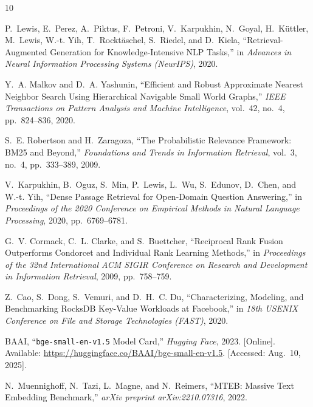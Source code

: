 \documentclass[conference]{IEEEtran}
\begin{document}
\begin{thebibliography}{10}

P.~Lewis, E.~Perez, A.~Piktus, F.~Petroni, V.~Karpukhin, N.~Goyal, H.~K\"uttler, M.~Lewis, W.-t. Yih, T.~Rockt\"aschel, S.~Riedel, and D.~Kiela,
``Retrieval-Augmented Generation for Knowledge-Intensive NLP Tasks,''
in \emph{Advances in Neural Information Processing Systems (NeurIPS)}, 2020.

Y.~A. Malkov and D.~A. Yashunin,
``Efficient and Robust Approximate Nearest Neighbor Search Using Hierarchical Navigable Small World Graphs,''
\emph{IEEE Transactions on Pattern Analysis and Machine Intelligence},
vol.~42, no.~4, pp.~824--836, 2020.

S.~E. Robertson and H.~Zaragoza,
``The Probabilistic Relevance Framework: BM25 and Beyond,''
\emph{Foundations and Trends in Information Retrieval},
vol.~3, no.~4, pp.~333--389, 2009.

V.~Karpukhin, B.~Oguz, S.~Min, P.~Lewis, L.~Wu, S.~Edunov, D.~Chen, and W.-t. Yih,
``Dense Passage Retrieval for Open-Domain Question Answering,''
in \emph{Proceedings of the 2020 Conference on Empirical Methods in Natural Language Processing}, 2020, pp.~6769--6781.

G.~V. Cormack, C.~L. Clarke, and S.~Buettcher,
``Reciprocal Rank Fusion Outperforms Condorcet and Individual Rank Learning Methods,''
in \emph{Proceedings of the 32nd International ACM SIGIR Conference on Research and Development in Information Retrieval}, 2009, pp.~758--759.

Z.~Cao, S.~Dong, S.~Vemuri, and D.~H.~C. Du,
``Characterizing, Modeling, and Benchmarking RocksDB Key-Value Workloads at Facebook,''
in \emph{18th USENIX Conference on File and Storage Technologies (FAST)}, 2020.

BAAI,
``\texttt{bge-small-en-v1.5} Model Card,''
\emph{Hugging Face}, 2023. [Online]. Available: \url{https://huggingface.co/BAAI/bge-small-en-v1.5}. [Accessed: Aug.~10, 2025].

N.~Muennighoff, N.~Tazi, L.~Magne, and N.~Reimers,
``MTEB: Massive Text Embedding Benchmark,''
\emph{arXiv preprint arXiv:2210.07316}, 2022.

\end{thebibliography}
\end{document}
